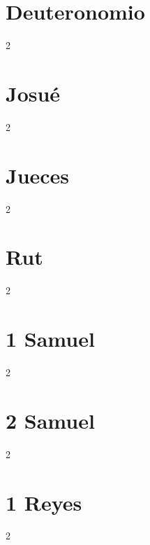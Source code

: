 \chapter{Deuteronomio}
\begin{multicols}{2}
  \raggedcolumns
  \parskip=0pt \relax
  
\end{multicols}

\chapter{Josué}
\begin{multicols}{2}
  \raggedcolumns
  \parskip=0pt \relax
  
\end{multicols}

\chapter{Jueces}
\begin{multicols}{2}
  \raggedcolumns
  \parskip=0pt \relax
  
\end{multicols}

\chapter{Rut}
\begin{multicols}{2}
  \raggedcolumns
  \parskip=0pt \relax
  
\end{multicols}

\chapter{1 Samuel}
\begin{multicols}{2}
  \raggedcolumns
  \parskip=0pt \relax
  
\end{multicols}

\chapter{2 Samuel}
\begin{multicols}{2}
  \raggedcolumns
  \parskip=0pt \relax
  
\end{multicols}

\chapter{1 Reyes}
\begin{multicols}{2}
  \raggedcolumns
  \parskip=0pt \relax
  
\end{multicols}

